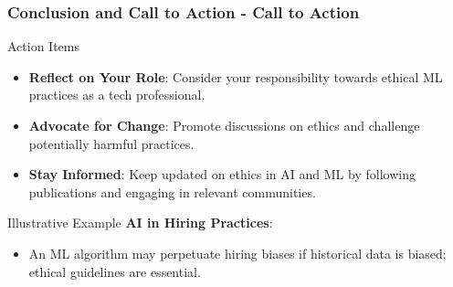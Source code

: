 \documentclass[aspectratio=169]{beamer}
\begin{document}
\begin{frame}[fragile]
  \frametitle{Conclusion and Call to Action - Call to Action}
  \begin{block}{Action Items}
    \begin{itemize}
      \item \textbf{Reflect on Your Role}: Consider your responsibility towards ethical ML practices as a tech professional.
      \item \textbf{Advocate for Change}: Promote discussions on ethics and challenge potentially harmful practices.
      \item \textbf{Stay Informed}: Keep updated on ethics in AI and ML by following publications and engaging in relevant communities.
    \end{itemize}
  \end{block}

  \begin{block}{Illustrative Example}
    \textbf{AI in Hiring Practices}:
    \begin{itemize}
      \item An ML algorithm may perpetuate hiring biases if historical data is biased; ethical guidelines are essential.
    \end{itemize}
  \end{block}
\end{frame}
\end{document}
